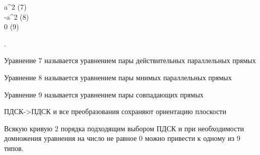 \begin{enumerate}
\begin{gathered}
		a^2 (7)\\ -a^2 (8) \\ 0 (9)
	\end{gathered}\right.\)
	\begin{definition}
		Уравнение 7 называется уравнением пары действительных параллельных прямых
	\end{definition}
	\begin{definition}
		Уравнение 8 называется уравнением пары мнимых параллельных прямых
	\end{definition}
	\begin{definition}
		Уравнение 9 называется уравнением пары совпадающих прямых
	\end{definition}
	\begin{note}
		ПДСК->ПДСК и все преобразования сохраняют ориентацию плоскости
	\end{note}
\end{enumerate}
\begin{theorem}
	Всякую кривую 2 порядка подходящим выбором ПДСК и при необходимости домножения уравнения на число не равное 0 можно привести к одному из 9 типов.
\end{theorem}
